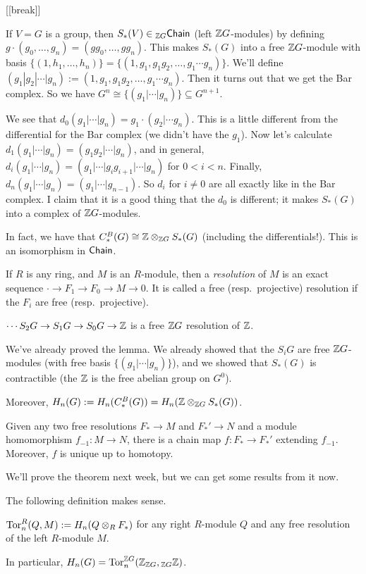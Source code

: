 [[break]]

If $V=G$ is a group, then $S_*(V)\in {}_{\mathbb{Z} G}\text{\sf Chain}$ (left $\mathbb{Z} G$-modules) by defining $g\cdot (g_0,\dots, g_n)=(gg_0,\dots, gg_n)$. This makes $S_*(G)$ into a free $\mathbb{Z} G$-module with basis $\{(1,h_1,\dots, h_n)\}=\{(1,g_1,g_1g_2,\dots, g_1\cdots g_n)\}$. We'll define $(g_1|g_2|\cdots |g_n):=(1,g_1,g_1g_2,\dots, g_1\cdots g_n)$. Then it turns out that we get the Bar complex. So we have $G^n\cong \{(g_1|\cdots | g_n)\}\subseteq G^{n+1}$.

We see that $d_0(g_1|\cdots | g_n)=g_1\cdot (g_2|\cdots g_n)$. This is a little different from the differential for the Bar complex (we didn't have the $g_1$). Now let's calculate $d_1(g_1|\cdots |g_n)=(g_1g_2|\cdots |g_n)$, and in general, $d_i(g_1|\cdots |g_n)=(g_1|\cdots | g_ig_{i+1}|\cdots |g_n)$ for $0<i<n$. Finally, $d_n(g_1|\cdots| g_n)= (g_1|\cdots| g_{n-1})$. So $d_i$ for $i\neq 0$ are all exactly like in the Bar complex. I claim that it is a good thing that the $d_0$ is different; it makes $S_*(G)$ into a complex of $\mathbb{Z} G$-modules.

In fact, we have that $C^B_*(G)\cong \mathbb{Z}\otimes_{\mathbb{Z} G} S_*(G)$ (including the differentials!). This is an isomorphism in $\text{\sf Chain}$.
\begin{definition}
 If $R$ is any ring, and $M$ is an $R$-module, then a \emph{resolution} of $M$ is an exact sequence $\cdot \to F_1\to F_0\to M\to 0$. It is called a free (resp.~projective) resolution if the $F_i$ are free (resp.~projective).
\end{definition}
\begin{lemma}
 $\cdots S_2G\to S_1G\to S_0G\to \mathbb{Z}$ is a free $\mathbb{Z} G$ resolution of $\mathbb{Z}$.
\end{lemma}
We've already proved the lemma. We already showed that the $S_i G$ are free $\mathbb{Z} G$-modules (with free basis $\{(g_1|\cdots | g_n)\}$), and we showed that $S_*(G)$ is contractible (the $\mathbb{Z}$ is the free abelian group on $G^0$).

Moreover, $H_n(G):= H_n(C_*^B(G))=H_n(\mathbb{Z}\otimes_{\mathbb{Z} G} S_*(G))$. \begin{theorem}
 Given any two free resolutions $F_*\to M$ and $F_*'\to N$ and a module homomorphism $f_{-1}\colon M\to N$, there is a chain map $f\colon F_*\to F_*'$ extending $f_{-1}$. Moreover, $f$ is unique up to homotopy.
\end{theorem}
We'll prove the theorem next week, but we can get some results from it now.
\begin{corollary}
 The following definition makes sense.
\end{corollary}
\begin{definition}
 $\operatorname{Tor}_n^R(Q,M):= H_n(Q\otimes_R F_*)$ for any right $R$-module $Q$ and any free resolution of the left $R$-module $M$.
\end{definition}
In particular, $H_n(G)=\operatorname{Tor}_n^{\mathbb{Z} G}(\mathbb{Z}_{\mathbb{Z} G},{}_{\mathbb{Z} G}\mathbb{Z})$.







